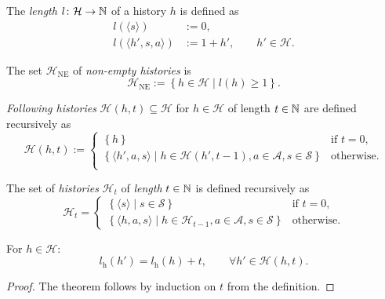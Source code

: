 \begin{definition} \label{def:hist-length}
The \emph{length} $l\colon \mathcal{H} \to \mathbb{N}$ of a history $h$ is defined as
\begin{align*}
l(\langle s \rangle) &:= 0, \\
l(\langle h', s, a \rangle) &:= 1 + h', \qquad h' \in \mathcal{H}. 
\end{align*}
\end{definition}

\begin{definition} \label{def:hist-ne}
The set $\mathcal{H}_{\mathrm{NE}}$ of \emph{non-empty histories} is
\[
\mathcal{H}_{\mathrm{NE}} := \left\{ h \in \mathcal{H} \mid  l(h) \ge 1 \right\}.
\]
 \leanok
\end{definition}

\begin{definition}\label{def:histories}
  \emph{Following histories} $\mathcal{H}(h,t) \subseteq \mathcal{H}$ for $h\in \mathcal{H}$ of length $t\in \mathbb{N}$ are defined recursively as
  \[
    \mathcal{H}(h,t) :=
    \begin{cases}
    \left\{  h \right\}  &\text{if } t = 0, \\
    \left\{  \langle h', a, s \rangle \mid h\in \mathcal{H}(h', t-1), a\in \mathcal{A}, s\in \mathcal{S}  \right\}  &\text{otherwise}. \\
    \end{cases}
  \]
\end{definition}

\begin{definition} \label{def:histories-horizon}
  The set of \emph{histories} $\mathcal{H}_{t}$ of \emph{length} $t \in \mathbb{N}$ is defined recursively as
  \[
    \mathcal{H}_t =
    \begin{cases}
      \left\{ \langle s \rangle \mid  s\in \mathcal{S} \right\} &\text{if } t = 0, \\
      \left\{ \langle h, a, s\rangle \mid h \in \mathcal{H}_{t-1}, a\in \mathcal{A}, s\in \mathcal{S} \right\} &\text{otherwise}.
    \end{cases}
  \]
   \leanok
\end{definition}

\begin{theorem} \label{thm:hist-lenth-eq-horizon}
  For $h \in \mathcal{H}$:
  \[
   l_{\mathrm{h}}(h') = l_{\mathrm{h}}(h) + t, \qquad \forall h'\in \mathcal{H}(h, t).
  \]
\end{theorem}
\begin{proof}
The theorem follows by induction on $t$ from the definition.  
\end{proof}

